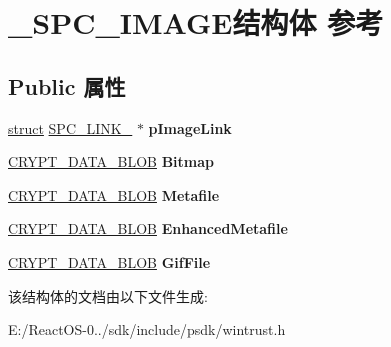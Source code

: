 \hypertarget{struct___s_p_c___i_m_a_g_e}{}\section{\+\_\+\+S\+P\+C\+\_\+\+I\+M\+A\+G\+E结构体 参考}
\label{struct___s_p_c___i_m_a_g_e}
\subsection*{Public 属性}
\begin{DoxyCompactItemize}
\item 
\mbox{\label{struct___s_p_c___i_m_a_g_e_a00589870050420267a3707a770e82471}} 
\hyperlink{interfacestruct}{struct} \hyperlink{struct_s_p_c___l_i_n_k__}{S\+P\+C\+\_\+\+L\+I\+N\+K\+\_\+} $\ast$ {\bfseries p\+Image\+Link}
\item 
\mbox{\label{struct___s_p_c___i_m_a_g_e_ad3ae35b369d069f2f83792d6a58fdec1}} 
\hyperlink{struct___c_r_y_p_t_o_a_p_i___b_l_o_b}{C\+R\+Y\+P\+T\+\_\+\+D\+A\+T\+A\+\_\+\+B\+L\+OB} {\bfseries Bitmap}
\item 
\mbox{\label{struct___s_p_c___i_m_a_g_e_ad6db1aec29dce4df2c9d3cdc0e71eb17}} 
\hyperlink{struct___c_r_y_p_t_o_a_p_i___b_l_o_b}{C\+R\+Y\+P\+T\+\_\+\+D\+A\+T\+A\+\_\+\+B\+L\+OB} {\bfseries Metafile}
\item 
\mbox{\label{struct___s_p_c___i_m_a_g_e_a0baf7abd66fca4d99e058c41ff742515}} 
\hyperlink{struct___c_r_y_p_t_o_a_p_i___b_l_o_b}{C\+R\+Y\+P\+T\+\_\+\+D\+A\+T\+A\+\_\+\+B\+L\+OB} {\bfseries Enhanced\+Metafile}
\item 
\mbox{\label{struct___s_p_c___i_m_a_g_e_a31ed4875b0b0f018b97f05a036fb9676}} 
\hyperlink{struct___c_r_y_p_t_o_a_p_i___b_l_o_b}{C\+R\+Y\+P\+T\+\_\+\+D\+A\+T\+A\+\_\+\+B\+L\+OB} {\bfseries Gif\+File}
\end{DoxyCompactItemize}


该结构体的文档由以下文件生成\+:\begin{DoxyCompactItemize}
\item 
E\+:/\+React\+O\+S-\/0../sdk/include/psdk/wintrust.\+h\end{DoxyCompactItemize}
